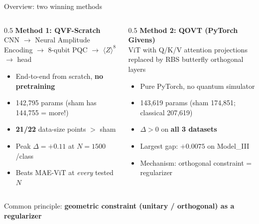 \documentclass[aspectratio=169]{beamer}
\newcommand{\win}[1]{\textcolor{good}{\textbf{#1}}}
\newcommand{\qs}[1]{\textcolor{q}{\textbf{#1}}}
\begin{document}
\begin{frame}{Overview: two winning methods}
\begin{columns}
\begin{column}{0.5\textwidth}
\textbf{\qs{Method 1: QVF-Scratch}}\\[4pt]
\small
CNN $\to$ Neural Amplitude Encoding $\to$ 8-qubit PQC $\to$ $\langle Z\rangle^8$ $\to$ head\\[6pt]
\begin{itemize}
  \item End-to-end from scratch, \textbf{no pretraining}
  \item 142,795 params (sham has 144,755 = more!)
  \item \win{21/22} data-size points $> $ sham
  \item Peak $\Delta = +0.11$ at $N=1500$/class
  \item Beats MAE-ViT at \emph{every} tested $N$
\end{itemize}
\end{column}
\begin{column}{0.5\textwidth}
\textbf{\qs{Method 2: QOVT (PyTorch Givens)}}\\[4pt]
\small
ViT with Q/K/V attention projections replaced by RBS butterfly orthogonal layers\\[6pt]
\begin{itemize}
  \item Pure PyTorch, no quantum simulator
  \item 143,619 params (sham 174,851; classical 207,619)
  \item $\Delta > 0$ on \textbf{all 3 datasets}
  \item Largest gap: $+0.0075$ on Model\_III
  \item Mechanism: orthogonal constraint = regularizer
\end{itemize}
\end{column}
\end{columns}

\bigskip
\centerline{\small Common principle: \textbf{geometric constraint (unitary / orthogonal) as a regularizer}}
\end{frame}
\end{document}
